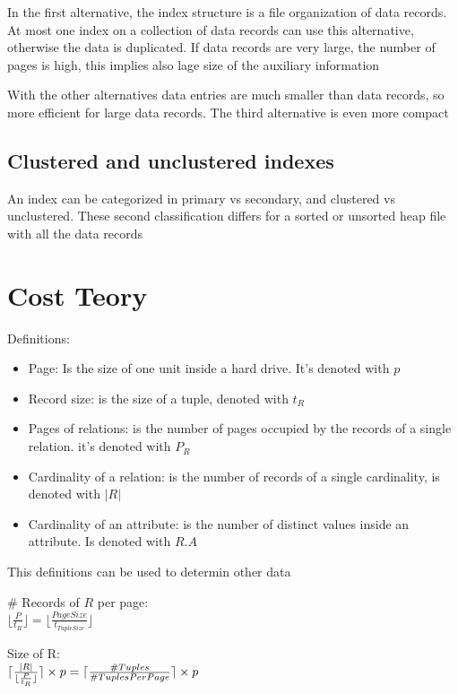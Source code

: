 \documentclass[12pt, a4paper]{article}
\DeclarePairedDelimiter{\ceil}{\lceil}{\rceil}
\begin{document}
In the first alternative, the index structure is a file organization of data records. At most one index on a 
collection of data records can use this alternative, otherwise the data is duplicated. If data records are 
very large, the number of pages is high, this implies also lage size of the auxiliary information

With the other alternatives data entries are much smaller than data records, so more efficient for large data 
records. The third alternative is even more compact

\subsection{Clustered and unclustered indexes}
An index can be categorized in primary vs secondary, and clustered vs unclustered. These second classification
differs for a sorted or unsorted heap file with all the data records

\newpage
\section{Cost Teory}
Definitions:
\begin{itemize}
    \item Page: Is the size of one unit inside a hard drive. It's denoted with $p$
    \item Record size: is the size of a tuple, denoted with $t_{R}$
    \item Pages of relations: is the number of pages occupied by the records of a single relation. it's denoted with $P_{R}$
    \item Cardinality of a relation: is the number of records of a single cardinality, is denoted with $|R|$
    \item Cardinality of an attribute: is the number of distinct values inside an attribute. Is denoted with $R.A$
\end{itemize}

This definitions can be used to determin other data

\begin{center}
    \# Records of $R$ per page:\\ $\lfloor \frac{P}{t_{R}}\rfloor = \lfloor \frac{PageSize}{t_{TupleSize}}\rfloor$

    Size of R:\\ $\ceil{\frac{|R|}{\lfloor\frac{P}{t_{R}}\rfloor}} \times p = \ceil{\frac{\# Tuples}{\# TuplesPerPage}} \times p$
\end{center}
\end{document}
